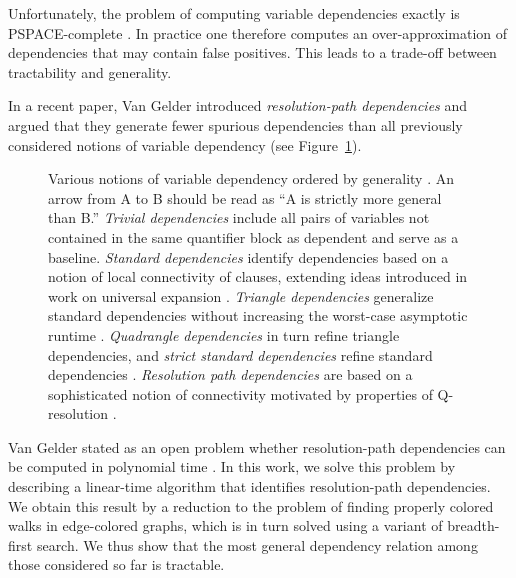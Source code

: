 \documentclass{llncs}
\newcommand{\longversion}[1]{#1}
\newcommand{\shortversion}[1]{}
\def\hy{\hbox{-}\nobreak\hskip0pt} \newcommand{\ellipsis}{}
\begin{document}
Unfortunately, the problem of computing variable dependencies exactly is
PSPACE-complete \cite{SamerSzeider09a}. In practice one therefore computes an
over\hy approximation of dependencies that may contain false positives. This
leads to a trade-off between tractability and generality.
\begin{sloppypar}
  In a recent paper, Van Gelder \cite{VanGelder11} introduced
  \emph{resolution\hy path dependencies} and argued that they generate fewer
  spurious dependencies than all previously considered notions of variable
  dependency (see Figure~\ref{fig:lattice}).
\end{sloppypar}
\shortversion{\begin{figure}[b]}
\longversion{\begin{figure}}
\begin{center}
\end{center}
\caption{Various notions of variable dependency ordered by generality
  \cite{VanGelder11}.  An arrow from A to B should be read as ``A is strictly
  more general than B.''  \emph{Trivial dependencies} include all pairs of
  variables not contained in the same quantifier block as dependent and serve
  as a baseline. \emph{Standard dependencies} \cite{SamerSzeider09a} identify
  dependencies based on a notion of local connectivity of clauses, extending
  ideas introduced in work on universal expansion
  \cite{Biere04,BubeckKleinebuning07}. \emph{Triangle dependencies} generalize
  standard dependencies without increasing the worst-case asymptotic runtime
  \cite{SamerSzeider09a}. \emph{Quadrangle dependencies} in turn refine
  triangle dependencies, and \emph{strict standard dependencies} refine
  standard dependencies \cite{VanGelder11}. \emph{Resolution path
    dependencies} are based on a sophisticated notion of connectivity motivated
  by properties of Q\hy resolution \cite{VanGelder11}.}
\label{fig:lattice}
\end{figure}
Van Gelder stated as an open problem whether resolution\hy path dependencies
can be computed in polynomial time \cite{VanGelder11}. In this work, we solve
this problem by describing a linear\hy time algorithm that identifies
resolution\hy path dependencies.  We obtain this result by a reduction to the
problem of finding properly colored walks in edge\hy colored graphs, which is
in turn solved using a variant of breadth\hy first search.  We thus show that
the most general dependency relation among those considered so far is
tractable. 
\end{document}
